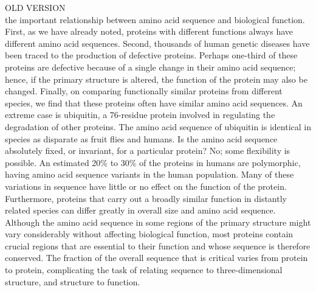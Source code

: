 OLD VERSION\\
the important relationship between amino acid sequence and biological function. First, as we have already noted, proteins with different functions always have different amino acid sequences. Second, thousands of human genetic diseases have been traced to the production of defective proteins. Perhaps one-third of these proteins are defective because of a single change in their amino acid sequence; hence, if the primary structure is altered, the function of the protein may also be changed. Finally, on comparing functionally similar proteins from different species, we find that these proteins often have similar amino acid sequences. An extreme case is ubiquitin, a 76-residue protein involved in regulating the degradation of other proteins. The amino acid sequence of ubiquitin is identical in species as disparate as fruit flies and humans. Is the amino acid sequence absolutely fixed, or invariant, for a particular protein? No; some flexibility is possible. An estimated 20\% to 30\% of the proteins in humans are polymorphic, having amino acid sequence variants in the human population. Many of these variations in sequence have little or no effect on the function of the protein. Furthermore, proteins that carry out a broadly similar function in distantly related species can differ greatly in overall size and amino acid sequence. Although the amino acid sequence in some regions of the primary structure might vary considerably without affecting biological function, most proteins contain crucial regions that are essential to their function and whose sequence is therefore conserved. The fraction of the overall sequence that is critical varies from protein to protein, complicating the task of relating sequence to three-dimensional structure, and structure to function. 

